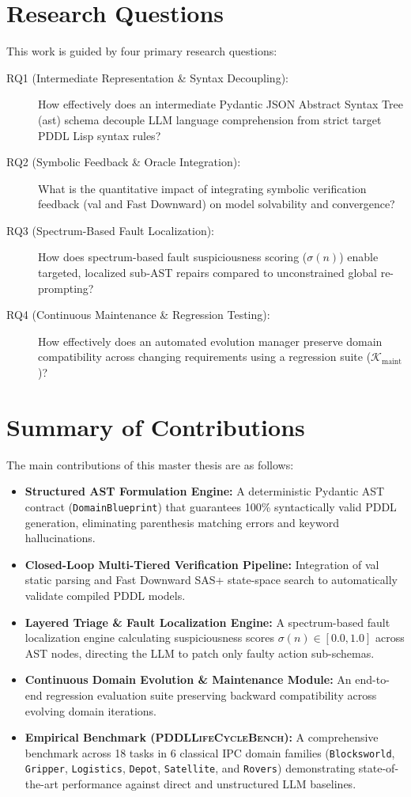 \section{Research Questions}
This work is guided by four primary research questions:
\begin{description}
    \item[RQ1 (Intermediate Representation \& Syntax Decoupling):] How effectively does an intermediate Pydantic JSON Abstract Syntax Tree (\gls{ast}) schema decouple LLM language comprehension from strict target PDDL Lisp syntax rules?
    \item[RQ2 (Symbolic Feedback \& Oracle Integration):] What is the quantitative impact of integrating symbolic verification feedback (\gls{val} and Fast Downward) on model solvability and convergence?
    \item[RQ3 (Spectrum-Based Fault Localization):] How does spectrum-based fault suspiciousness scoring ($\sigma(n)$) enable targeted, localized sub-AST repairs compared to unconstrained global re-prompting?
    \item[RQ4 (Continuous Maintenance \& Regression Testing):] How effectively does an automated evolution manager preserve domain compatibility across changing requirements using a regression suite ($\mathcal{K}_{\text{maint}}$)?
\end{description}

\section{Summary of Contributions}
The main contributions of this master thesis are as follows:
\begin{itemize}
    \item \textbf{Structured AST Formulation Engine:} A deterministic Pydantic AST contract (\texttt{DomainBlueprint}) that guarantees 100\% syntactically valid PDDL generation, eliminating parenthesis matching errors and keyword hallucinations.
    \item \textbf{Closed-Loop Multi-Tiered Verification Pipeline:} Integration of \gls{val} static parsing and Fast Downward SAS+ state-space search to automatically validate compiled PDDL models.
    \item \textbf{Layered Triage \& Fault Localization Engine:} A spectrum-based fault localization engine calculating suspiciousness scores $\sigma(n) \in [0.0, 1.0]$ across AST nodes, directing the LLM to patch only faulty action sub-schemas.
    \item \textbf{Continuous Domain Evolution \& Maintenance Module:} An end-to-end regression evaluation suite preserving backward compatibility across evolving domain iterations.
    \item \textbf{Empirical Benchmark (\textsc{PDDLLifeCycleBench}):} A comprehensive benchmark across 18 tasks in 6 classical IPC domain families (\texttt{Blocksworld}, \texttt{Gripper}, \texttt{Logistics}, \texttt{Depot}, \texttt{Satellite}, and \texttt{Rovers}) demonstrating state-of-the-art performance against direct and unstructured LLM baselines.
\end{itemize}
